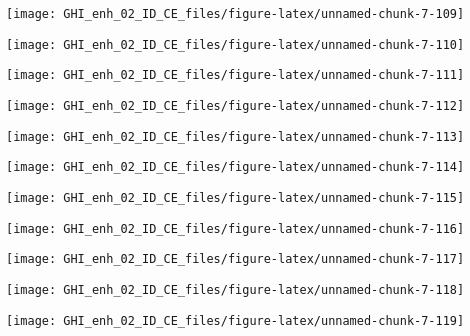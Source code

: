\documentclass[
  10pt,
  a4paper,oneside]{article}
\begin{document}
\begin{center}\texttt{[image: GHI\_enh\_02\_ID\_CE\_files/figure-latex/unnamed-chunk-7-109]} \end{center}

\begin{center}\texttt{[image: GHI\_enh\_02\_ID\_CE\_files/figure-latex/unnamed-chunk-7-110]} \end{center}

\begin{center}\texttt{[image: GHI\_enh\_02\_ID\_CE\_files/figure-latex/unnamed-chunk-7-111]} \end{center}

\begin{center}\texttt{[image: GHI\_enh\_02\_ID\_CE\_files/figure-latex/unnamed-chunk-7-112]} \end{center}

\begin{center}\texttt{[image: GHI\_enh\_02\_ID\_CE\_files/figure-latex/unnamed-chunk-7-113]} \end{center}

\begin{center}\texttt{[image: GHI\_enh\_02\_ID\_CE\_files/figure-latex/unnamed-chunk-7-114]} \end{center}

\begin{center}\texttt{[image: GHI\_enh\_02\_ID\_CE\_files/figure-latex/unnamed-chunk-7-115]} \end{center}

\begin{center}\texttt{[image: GHI\_enh\_02\_ID\_CE\_files/figure-latex/unnamed-chunk-7-116]} \end{center}

\begin{center}\texttt{[image: GHI\_enh\_02\_ID\_CE\_files/figure-latex/unnamed-chunk-7-117]} \end{center}

\begin{center}\texttt{[image: GHI\_enh\_02\_ID\_CE\_files/figure-latex/unnamed-chunk-7-118]} \end{center}

\begin{center}\texttt{[image: GHI\_enh\_02\_ID\_CE\_files/figure-latex/unnamed-chunk-7-119]} \end{center}
\end{document}
